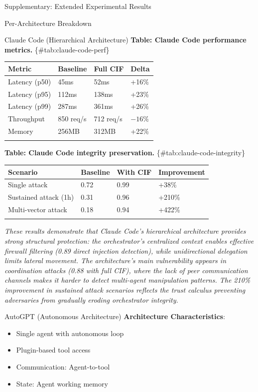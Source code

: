 \documentclass[
  ignorenonframetext,
]{beamer}
\newcounter{none} %
\begin{document}
\begin{frame}[fragile]{Supplementary: Extended Experimental Results}
\begin{block}{Per-Architecture Breakdown}
\begin{block}{Claude Code (Hierarchical Architecture)}
\textbf{Table: Claude Code performance metrics.}
\{\#tab:claude-code-perf\}

{\def\LTcaptype{none} %
\begin{longtable}[]{@{}llll@{}}
\toprule\noalign{}
Metric & Baseline & Full CIF & Delta \\
\midrule\noalign{}
\endhead
Latency (p50) & 45ms & 52ms & +16\% \\
Latency (p95) & 112ms & 138ms & +23\% \\
Latency (p99) & 287ms & 361ms & +26\% \\
Throughput & 850 req/s & 712 req/s & \(-16\%\) \\
Memory & 256MB & 312MB & +22\% \\
\bottomrule\noalign{}
\end{longtable}
}

\textbf{Table: Claude Code integrity preservation.}
\{\#tab:claude-code-integrity\}

{\def\LTcaptype{none} %
\begin{longtable}[]{@{}llll@{}}
\toprule\noalign{}
Scenario & Baseline & With CIF & Improvement \\
\midrule\noalign{}
\endhead
Single attack & 0.72 & 0.99 & +38\% \\
Sustained attack (1h) & 0.31 & 0.96 & +210\% \\
Multi-vector attack & 0.18 & 0.94 & +422\% \\
\bottomrule\noalign{}
\end{longtable}
}

\emph{These results demonstrate that Claude Code's hierarchical
architecture provides strong structural protection: the orchestrator's
centralized context enables effective firewall filtering (0.89 direct
injection detection), while unidirectional delegation limits lateral
movement. The architecture's main vulnerability appears in coordination
attacks (0.88 with full CIF), where the lack of peer communication
channels makes it harder to detect multi-agent manipulation patterns.
The 210\% improvement in sustained attack scenarios reflects the trust
calculus preventing adversaries from gradually eroding orchestrator
integrity.}
\end{block}

\begin{block}{AutoGPT (Autonomous Architecture)}
\protect{}\label{sec:autogpt}
\textbf{Architecture Characteristics}:

\begin{itemize}
\item Single agent with autonomous loop
\item Plugin-based tool access
\item Communication: Agent-to-tool
\item State: Agent working memory
\end{itemize}


\end{block}
\end{block}
\end{frame}
\end{document}
